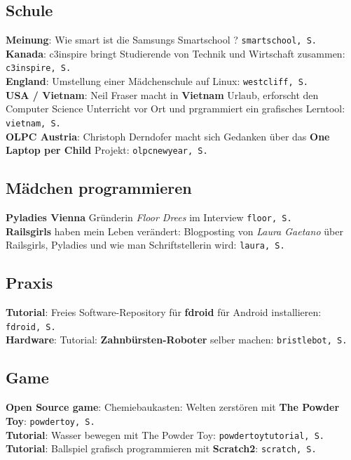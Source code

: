 \documentclass[10pt,a4paper,ngerman,twoside]{article} %
\newcommand{\SepRule}{\noindent	%
\begin{center}
\rule{250pt}{1pt} %
\end{center}
}
\begin{document}
\begin{multicols}{3}
\subsection*{Schule}

\textbf{Meinung}: Wie smart ist die Samsungs Smartschool ? \texttt{smartschool, S. \pageref{smartschool}}\\
\textbf{Kanada}: c3inspire bringt Studierende von Technik und Wirtschaft zusammen: \texttt{c3inspire, S. \pageref{c3inspire}}\\
\textbf{England}: Umstellung einer Mädchenschule auf Linux: \texttt{westcliff, S. \pageref{westcliff}}\\
\textbf{USA / Vietnam}: Neil Fraser macht in \textbf{Vietnam} Urlaub, erforscht den Computer Science Unterricht vor Ort und prgrammiert ein grafisches Lerntool: \texttt{vietnam, S. \pageref{vietnam}}\\ 
\textbf{OLPC Austria}: Christoph Derndofer macht sich Gedanken über das \textbf{One Laptop per Child} Projekt: \texttt{olpcnewyear, S. \pageref{olpcnewyear}}\\

\subsection*{Mädchen programmieren}

\textbf{Pyladies Vienna} Gründerin \textit{Floor Drees} im Interview \texttt{floor, S. \pageref{floor}}\\
\textbf{Railsgirls} haben mein Leben verändert: Blogposting von \textit{Laura Gaetano} über Railsgirls, Pyladies und wie man Schriftstellerin wird: \texttt{laura, S.\pageref{laura}}\\

\subsection*{Praxis}

\textbf{Tutorial}: Freies Software-Repository für \textbf{fdroid} für Android installieren: \texttt{fdroid, S. \pageref{fdroid}}\\ \textbf{Hardware}: Tutorial: \textbf{Zahnbürsten-Roboter} selber machen: \texttt{bristlebot, S. \pageref{bristlebot}}\\

\subsection*{Game}

\textbf{Open Source game}: Chemiebaukasten: Welten zerstören mit \textbf{The Powder Toy}: \texttt{powdertoy, S. \pageref{powdertoy}}\\
\textbf{Tutorial}: Wasser bewegen mit The Powder Toy: \texttt{powdertoytutorial, S. \pageref{powdertoytutorial}}\\
\textbf{Tutorial}: Ballspiel grafisch programmieren mit \textbf{Scratch2}: \texttt{scratch, S. \pageref{scratch}}\\
\end{multicols}

\end{document}

